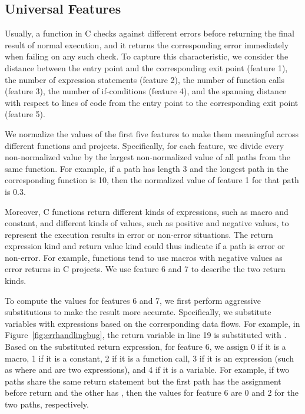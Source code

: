 \documentclass[12pt]{report}	%
\begin{document}
\subsection{Universal Features}
\label{sec:app:features:uni}

Usually, a function in C checks against different errors before returning the final result of normal execution,
and it returns the corresponding error immediately when failing on any such check.
To capture this characteristic,
we consider the distance between the entry point and the corresponding exit point (feature 1),
the number of expression statements (feature 2), the number of function calls (feature 3), the number of if-conditions (feature 4),
and the spanning distance with respect to lines of code from the entry point to the corresponding exit point (feature 5).

We normalize the values of the first five features to make them meaningful across different functions and projects.
Specifically, for each feature, we divide every non-normalized value
by the largest non-normalized value of all paths from the same function.
For example, if a path has length 3 and the longest path in the corresponding function is 10,
then the normalized value of feature 1 for that path is 0.3.

Moreover, C functions return different kinds of expressions, such as macro and constant,
and different kinds of values, such as positive and negative values,
to represent the execution results in error or non-error situations.
%
The return expression kind and return value kind could thus indicate if a path is error or non-error.
For example, functions tend to use macros with negative values as error returns in C projects.
We use feature 6 and 7 to describe the two return kinds.

To compute the values for features 6 and 7, we first 
perform aggressive substitutions to make the result more accurate. 
%
Specifically, we substitute variables with expressions based on the corresponding data flows.
For example, in Figure~\ref{fig:errhandlingbug}, 
the return variable  in line 19 is substituted with .
%
Based on the substituted return expression, for feature 6, 
we assign 0 if it is a macro,
1 if it is a constant, 
2 if it is a function call,
3 if it is an expression 
(such as  where  and  are two expressions), 
and 4 if it is a variable.
%
For example, if two paths share the same return statement 
but the first path has the assignment  before return 
and the other has , then the values for feature 6 
are 0 and 2 for the two paths, respectively. 
%
\end{document}
